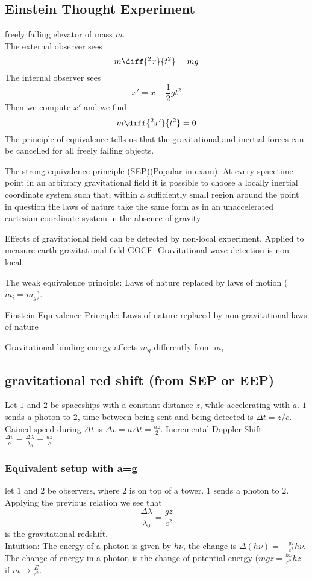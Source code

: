 \subsection{Einstein Thought Experiment}
freely falling elevator of mass $m$.\\
The external observer sees 
$$
m\diff{^2x}{t^2} = mg
$$
The internal observer sees
$$
x' = x - \frac{1}{2}gt^2
$$
Then we compute $x'$ and we find
$$
m\diff{^2 x'}{t^2} = 0
$$
The principle of equivalence tells us that the gravitational and inertial forces can be cancelled for all freely falling objects.

The strong equivalence principle (SEP)(Popular in exam): At every spacetime point in an arbitrary gravitational field it is possible to choose a locally inertial coordinate system such that, within a sufficiently small region around the point in question the laws of nature take the same form as in an unaccelerated cartesian coordinate system in the absence of gravity 

Effects of gravitational field can be detected by non-local experiment. Applied to measure earth gravitational field GOCE. Gravitational wave detection is non local.

The weak equivalence principle: Laws of nature replaced by laws of motion ($m_i = m_g$).

Einstein Equivalence Principle: Laws of nature replaced by non gravitational laws of nature

Gravitational binding energy affects $m_g$ differently from $m_i$

\subsection{gravitational red shift (from SEP or EEP)}
Let $1$ and $2$ be spaceships with a constant distance $z$, while accelerating with $a$. $1$ sends a photon to $2$, time between being sent and being detected is $\Delta t = z/c$. Gained speed during $\Delta t$ is $\Delta v = a\Delta t = \frac{az}{2}$. Incremental Doppler Shift $\frac{\Delta v}{c} = \frac{\Delta \lambda}{\lambda_0} = \frac{az}{c}$
\subsubsection{Equivalent setup with a=g}
let $1$ and $2$ be observers, where $2$ is on top of a tower. $1$ sends a photon to $2$. Applying the previous relation we see that
$$
\frac{\Delta\lambda}{\lambda_0}= \frac{gz}{c^2}
$$
is the gravitational redshift.\\
Intuition: The energy of a photon is given by $h\nu$, the change is $\Delta(h\nu) = -\frac{gz}{c^2}h\nu$. The change of energy in a photon is the change of potential energy $(mgz = \frac{h\nu}{c^2}hz$ if $m\rightarrow \frac{E}{c^2}$.

